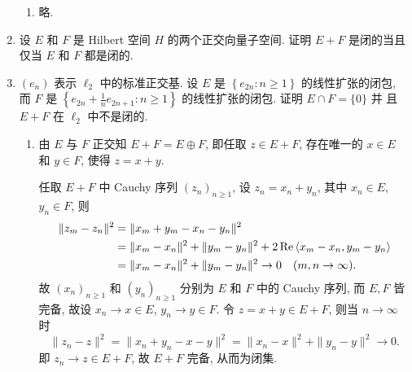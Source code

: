 \begin{enumerate}
\begin{answer}
\begin{enumerate}
        \item 略.
      \end{enumerate}
    \end{answer}
  \item 设 $E$ 和 $F$ 是 Hilbert 空间 $H$ 的两个正交向量子空间. 证明 $E+F$ 是闭的当且仅当 $E$ 和 $F$ 都是闭的.
    
  \item $(e_{n})$ 表示 $\ell_{2}$ 中的标准正交基. 
  设 $E$ 是 $\left\{e_{2 n}: n \geq 1\right\}$ 的线性扩张的闭包, 
  而 $F$ 是 $\left\{e_{2 n}+\frac{1}{n} e_{2 n+1}: n \geq 1\right\}$ 的线性扩张的闭包. 
  证明 $E\cap F=\{0\}$ 并 且 $E+F$ 在 $\ell_{2}$ 中不是闭的.
    \begin{answer}
      \begin{enumerate}
        \item 由 $E$ 与 $F$ 正交知 $E+F=E\oplus F$, 即任取 $z\in E+F$,
        存在唯一的 $x\in E$ 和 $y\in F$, 使得 $z=x+y$.
    
    
        {
        任取 $E+F$ 中 Cauchy 序列 $(z_n)_{n\geq 1}$, 设 $z_n=x_n+y_n$, 其中 $x_n\in E$, $y_n\in F$, 则
        \begin{align*}
            \|z_m-z_n\|^2
            & =\|x_m+y_m-x_n-y_n\|^2 \\
            & =\|x_m-x_n\|^2+\|y_m-y_n\|^2+2\operatorname{Re}\left\langle x_m-x_n,y_m-y_n\right\rangle \\
            & =\|x_m-x_n\|^2+\|y_m-y_n\|^2\to 0\quad (m,n\to\infty).
        \end{align*}
        故 $(x_n)_{n\geq 1}$ 和 $(y_n)_{n\geq 1}$ 分别为 $E$ 和 $F$ 中的 Cauchy 序列,
        而 $E,F$ 皆完备, 故设 $x_n\to x\in E$, $y_n\to y\in F$.
        令 $z=x+y\in E+F$, 则当 $n\to\infty$ 时
        \[\|z_n-z\|^2=\|x_n+y_n-x-y\|^2=\|x_n-x\|^2+\|y_n-y\|^2\to 0.\]
        即 $z_n\to z\in E+F$, 故 $E+F$ 完备, 从而为闭集.}
    

\end{enumerate}
\end{answer}
\end{enumerate}
